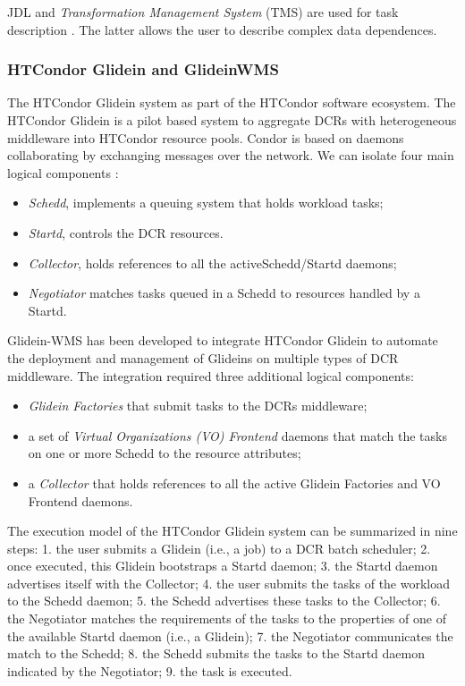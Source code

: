 JDL and \emph{Transformation Management System} (TMS) are used for task description \cite{Tsaregorodtsev2006,Pacini2006}. The latter allows the user to describe complex data dependences. 
\subsubsection{HTCondor Glidein and GlideinWMS}
The HTCondor Glidein system  as part of the HTCondor software ecosystem. The HTCondor Glidein is a pilot based system to aggregate DCRs with heterogeneous middleware into HTCondor resource pools.
Condor is based on daemons collaborating by exchanging messages over the network. We can isolate four main logical components \cite{Sfiligoi2008}:
\begin{itemize}
\item \emph{Schedd}, implements a queuing system that holds workload tasks;
\item \emph{Startd}, controls the DCR resources. 
\item \emph{Collector}, holds references to all the activeSchedd/Startd daemons; 
\item \emph{Negotiator} matches tasks queued in a Schedd to resources handled by a Startd.
\end{itemize}
Glidein-WMS has been developed to integrate HTCondor Glidein to  automate the deployment and management of Glideins on multiple types of DCR middleware. 
The integration required three additional logical components: 
\begin{itemize}
\item \emph{Glidein Factories} that submit tasks to the DCRs middleware;
\item a set of \emph{Virtual Organizations (VO) Frontend} daemons that match the tasks on one or more Schedd to the resource attributes;
\item a \emph{Collector} that holds references to all the active Glidein Factories and VO Frontend daemons. 
\end{itemize}

 The execution model of the HTCondor Glidein system can be summarized in nine steps: 1. the user submits a Glidein (i.e., a job) to a DCR batch scheduler; 2. once executed, this Glidein bootstraps a Startd daemon; 3. the Startd daemon advertises itself with the Collector; 4. the user submits the tasks of the workload to the Schedd daemon; 5. the Schedd advertises these tasks to the Collector; 6. the Negotiator matches the requirements of the tasks to the properties of one of the available Startd daemon (i.e., a Glidein); 7. the Negotiator communicates the match to the Schedd; 8. the Schedd submits the tasks to the Startd daemon indicated by
the Negotiator; 9. the task is executed.

